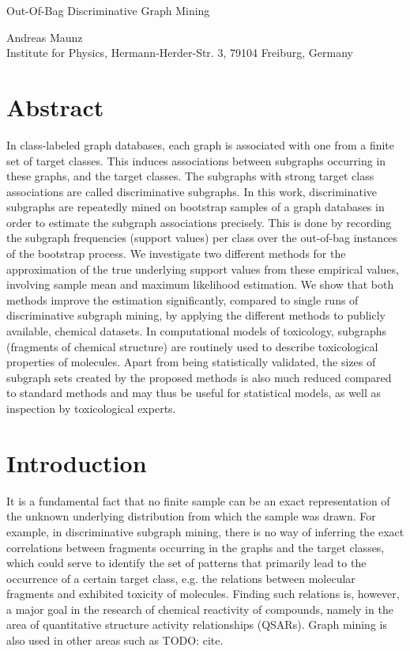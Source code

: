 \documentclass{article}
\begin{document}

\begin{center}
\begin{huge}Out-Of-Bag Discriminative Graph Mining\end{huge}

Andreas Maunz \\Institute for Physics, Hermann-Herder-Str. 3, 79104 Freiburg, Germany
\end{center}

\section{Abstract}

In class-labeled graph databases, each graph is associated with one from a
finite set of target classes.  This induces associations between subgraphs
occurring in these graphs, and the target classes. The subgraphs with strong
target class associations are called discriminative subgraphs.
In this work, discriminative subgraphs are repeatedly mined on bootstrap
samples of a graph databases in order to estimate
the subgraph associations precisely.  This is done by recording the subgraph frequencies (support values) per class
over the out-of-bag instances of the bootstrap process. 
We investigate two different methods for the approximation of the true
underlying support values from these empirical values, involving
sample mean and maximum likelihood estimation.  We show that both methods
improve the estimation significantly, compared to single runs of discriminative
subgraph mining, by applying the different methods to publicly available,
chemical datasets.
In computational models of toxicology, subgraphs (fragments of chemical structure) are
routinely used to describe toxicological properties of molecules. Apart from
being statistically validated, the sizes of subgraph sets created by the
proposed methods is also much reduced compared to standard methods and may thus
be useful for statistical models, as well as inspection by toxicological
experts.

\section{Introduction}
It is a fundamental fact that no finite sample can be an exact
representation of the unknown underlying distribution from which the sample was
drawn.  For example, in discriminative subgraph mining, there is no way of
inferring the exact correlations between fragments occurring in the graphs and
the target classes, which could serve to identify the set of patterns that
primarily lead to the occurrence of a certain target class, e.g. the relations
between molecular fragments and exhibited toxicity of molecules. Finding such
relations is, however, a major goal in the research of chemical reactivity of
compounds, namely in the area of quantitative structure activity relationships
(QSARs). Graph mining is also used in other areas such as TODO: cite.
\end{document}
